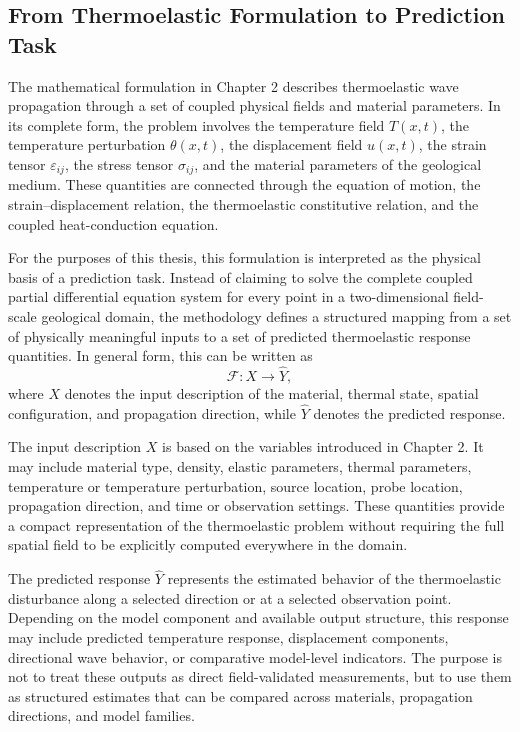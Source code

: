 \subsection{From Thermoelastic Formulation to Prediction Task}

The mathematical formulation in Chapter 2 describes thermoelastic wave propagation through a set of coupled physical fields and material parameters. In its complete form, the problem involves the temperature field \(T(x,t)\), the temperature perturbation \(\theta(x,t)\), the displacement field \(u(x,t)\), the strain tensor \(\varepsilon_{ij}\), the stress tensor \(\sigma_{ij}\), and the material parameters of the geological medium. These quantities are connected through the equation of motion, the strain--displacement relation, the thermoelastic constitutive relation, and the coupled heat-conduction equation.

For the purposes of this thesis, this formulation is interpreted as the physical basis of a prediction task. Instead of claiming to solve the complete coupled partial differential equation system for every point in a two-dimensional field-scale geological domain, the methodology defines a structured mapping from a set of physically meaningful inputs to a set of predicted thermoelastic response quantities. In general form, this can be written as
\begin{equation}
\mathcal{F}:
X
\rightarrow
\widehat{Y},
\end{equation}
where \(X\) denotes the input description of the material, thermal state, spatial configuration, and propagation direction, while \(\widehat{Y}\) denotes the predicted response.

The input description \(X\) is based on the variables introduced in Chapter 2. It may include material type, density, elastic parameters, thermal parameters, temperature or temperature perturbation, source location, probe location, propagation direction, and time or observation settings. These quantities provide a compact representation of the thermoelastic problem without requiring the full spatial field to be explicitly computed everywhere in the domain.

The predicted response \(\widehat{Y}\) represents the estimated behavior of the thermoelastic disturbance along a selected direction or at a selected observation point. Depending on the model component and available output structure, this response may include predicted temperature response, displacement components, directional wave behavior, or comparative model-level indicators. The purpose is not to treat these outputs as direct field-validated measurements, but to use them as structured estimates that can be compared across materials, propagation directions, and model families.

